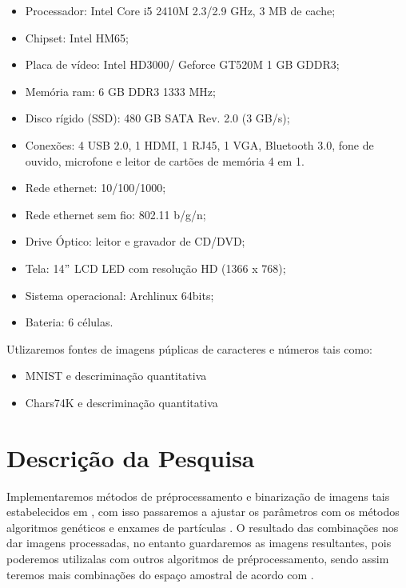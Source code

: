 \documentclass[12pt,a4paper,oneside]{book}
\newcommand\wb[1]{\discretionary{#1}{#1}{#1}}
\begin{document}
\begin{itemize}
    \item Processador: Intel Core i5 2410M 2.3/2.9 GHz, 3 MB de cache;
    \item Chipset: Intel HM65;
    \item Placa de v\'{i}deo: Intel HD3000/ Geforce GT520M 1 GB GDDR3;
    \item Mem\'{o}ria ram: 6 GB DDR3 1333 MHz;
    \item Disco r\'{i}gido (SSD): 480 GB SATA Rev. 2.0 (3 GB/s);
    \item Conex\~{o}es: 4 USB 2.0, 1 HDMI, 1 RJ45, 1 VGA, Bluetooth 3.0, fone de
        ouvido, microfone e leitor de cart\~{o}es de mem\'{o}ria 4 em 1.
    \item Rede ethernet: 10/100/1000;
    \item Rede ethernet sem fio: 802.11 b/g/n;
    \item Drive \'{O}ptico: leitor e gravador de CD/DVD;
    \item Tela: 14$"$ LCD LED com resolu\c{c}\~{a}o HD (1366 x 768);
    \item Sistema operacional: Archlinux 64bits;
    \item Bateria: 6 c\'{e}lulas.
\end{itemize}

\noindent
Utlizaremos fontes de imagens p\'{u}plicas de caracteres e n\'{u}meros tais
como:

\begin{itemize}
    \item MNIST \cite[MNIST]{einstein} e descrimina\c{c}\~{a}o quantitativa
    \item Chars74K \cite[Chars74K]{einstein} e descrimina\c{c}\~{a}o
        quantitativa
\end{itemize}
\section{Descri\c{c}\~{a}o da Pesquisa}
Implementaremos m\'{e}todos de pr\'{e}\wb-processamento e binariza\c{c}\~{a}o de
imagens tais estabelecidos em \cite{GUPTA2007389}, com isso
passaremos a ajustar os par\^{a}metros com os m\'{e}todos algoritmos
gen\'{e}ticos \cite[GA]{einstein} e enxames de part\'{i}culas
\cite[PSO]{einstein}. O resultado das combina\c{c}\~{o}es nos dar imagens
processadas, no entanto guardaremos as imagens resultantes, pois poderemos
utiliza\wb-las com outros algoritmos de pr\'{e}\wb-processamento, sendo assim
teremos mais combina\c{c}\~{o}es do espa\c{c}o amostral de acordo com
\cite[Pipeline-processamento-imagens]{einstein}.
\end{document}
